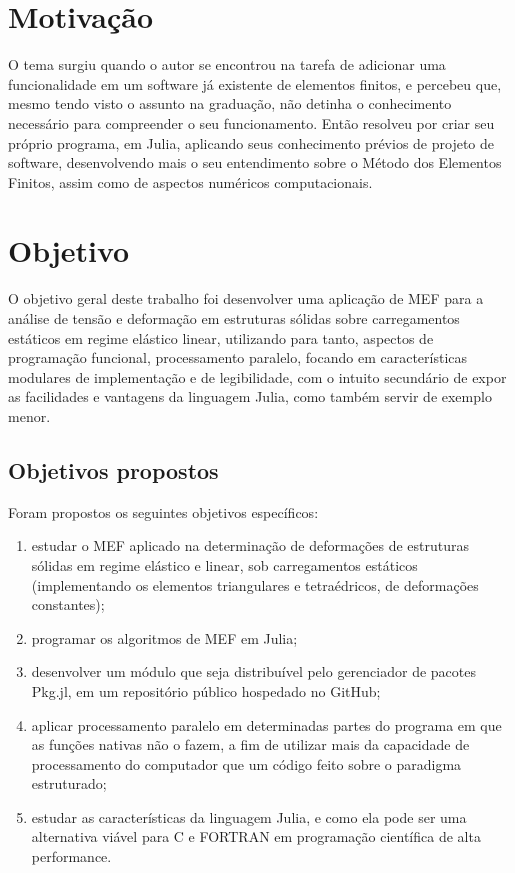 \section{Motivação}

O tema surgiu quando o autor se encontrou na tarefa de adicionar uma funcionalidade em um software já existente de elementos finitos, e percebeu que, mesmo tendo visto o assunto na graduação, não detinha o conhecimento necessário para compreender o seu funcionamento. Então resolveu por criar seu próprio programa, em Julia, aplicando seus conhecimento prévios de projeto de software, desenvolvendo mais o seu entendimento sobre o Método dos Elementos Finitos, assim como de aspectos numéricos computacionais.


\section{Objetivo}

O objetivo geral deste trabalho foi desenvolver uma aplicação de MEF para a análise de tensão e deformação em estruturas sólidas sobre carregamentos estáticos em regime elástico linear, utilizando para tanto, aspectos de programação funcional, processamento paralelo, focando em características modulares de implementação e de legibilidade, com o intuito secundário de expor as facilidades e vantagens da linguagem Julia, como também servir de exemplo menor.

\subsection{Objetivos propostos}

Foram propostos os seguintes objetivos específicos:

\begin{enumerate}
    \item estudar o MEF aplicado na determinação de deformações de estruturas sólidas em regime elástico e linear, sob carregamentos estáticos (implementando os elementos triangulares e tetraédricos, de deformações constantes);
    \item programar os algoritmos de MEF em Julia;
    \item desenvolver um módulo que seja distribuível pelo gerenciador de pacotes Pkg.jl, em um repositório público hospedado no GitHub;
    \item aplicar processamento paralelo em determinadas partes do programa em que as funções nativas não o fazem, a fim de utilizar mais da capacidade de processamento do computador que um código feito sobre o paradigma estruturado;
    \item estudar as características da linguagem Julia, e como ela pode ser uma alternativa viável para C e FORTRAN em programação científica de alta performance.
\end{enumerate}

